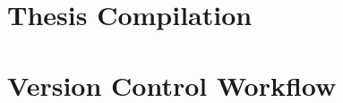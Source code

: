 \section{Thesis Compilation}
\label{sec:app-latex}


\section{Version Control Workflow}
\label{sec:app-git}

